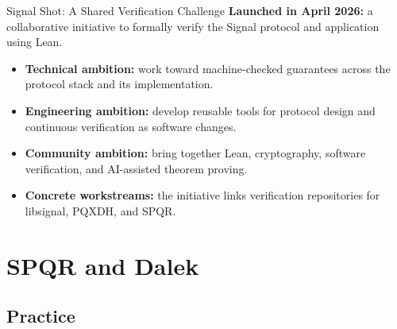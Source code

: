 \documentclass[aspectratio=169,xcolor=dvipsnames]{beamer}
\begin{document}
\begin{frame}{Signal Shot: A Shared Verification Challenge}
    \small
    \textbf{Launched in April 2026:} a collaborative initiative to formally verify
    the Signal protocol and application using Lean.
    \begin{itemize}
        \item \textbf{Technical ambition:} work toward machine-checked guarantees across the protocol stack and its implementation.
        \item \textbf{Engineering ambition:} develop reusable tools for protocol design and continuous verification as software changes.
        \item \textbf{Community ambition:} bring together Lean, cryptography, software verification, and AI-assisted theorem proving.
        \item \textbf{Concrete workstreams:} the initiative links verification repositories for libsignal, PQXDH, and SPQR.
    \end{itemize}
\end{frame}

\section{SPQR and Dalek}
\subsection{Practice}
\end{document}
